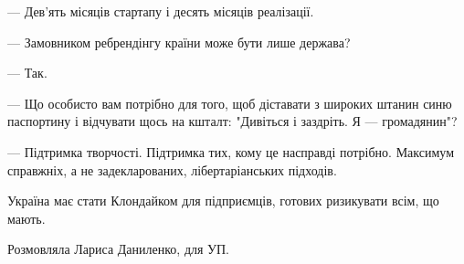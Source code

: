 --- Дев’ять місяців стартапу і десять місяців реалізації.

--- Замовником ребрендінгу країни може бути лише держава?

--- Так.

--- Що особисто вам потрібно для того, щоб діставати з широких штанин синю
паспортину і відчувати щось на кшталт: "Дивіться і заздріть. Я --- громадянин"?

--- Підтримка творчості. Підтримка тих, кому це насправді потрібно. Максимум
справжніх, а не задекларованих, лібертаріанських підходів. 

Україна має стати Клондайком для підприємців, готових ризикувати всім, що
мають. 

Розмовляла Лариса Даниленко, для УП.
